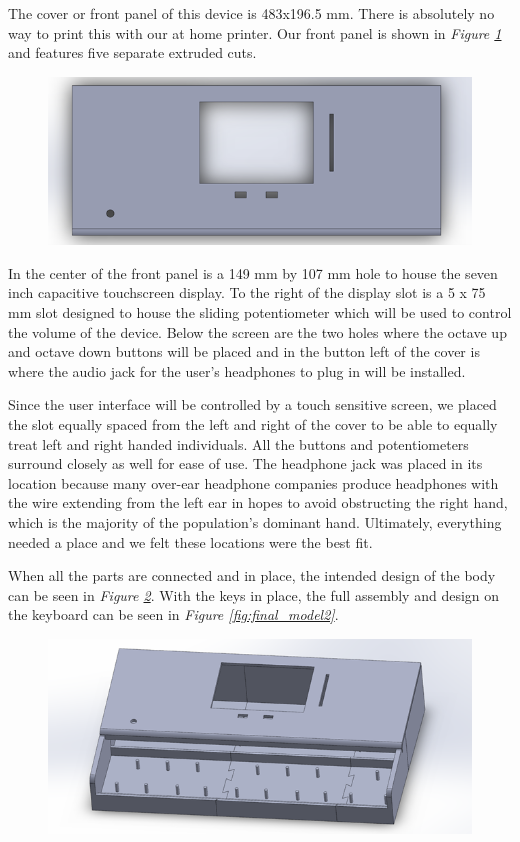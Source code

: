 The cover or front panel of this device is 483x196.5 mm. There is absolutely no way to print this with our at home printer. Our front panel is shown in \textit{Figure \ref{fig:display_model}} and features five separate extruded cuts.

\begin{figure}[h!]
  \centering
  \includegraphics[width=0.9\linewidth]{image/DisplayModel.png}
  \caption{}
  \label{fig:display_model}
\end{figure}

In the center of the front panel is a 149 mm by 107 mm hole to house the seven inch capacitive touchscreen display. To the right of the display slot is a 5 x 75 mm slot designed to house the sliding potentiometer which will be used to control the volume of the device. Below the screen are the two holes where the octave up and octave down buttons will be placed and in the button left of the cover is where the audio jack for the user’s headphones to plug in will be installed.

Since the user interface will be controlled by a touch sensitive screen, we placed the slot equally spaced from the left and right of the cover to be able to equally treat left and right handed individuals. All the buttons and potentiometers surround closely as well for ease of use. The headphone jack was placed in its location because many over-ear headphone companies produce headphones with the wire extending from the left ear in hopes to avoid obstructing the right hand, which is the majority of the population’s dominant hand. Ultimately, everything needed a place and we felt these locations were the best fit.

When all the parts are connected and in place, the intended design of the body can be seen in \textit{Figure \ref{fig:final_model1}}. With the keys in place, the full assembly and design on the keyboard can be seen in \textit{Figure \ref{fig:final_model2}}.

\begin{figure}[h!]
  \centering
  \includegraphics[width=0.8\linewidth]{image/FinalModel1.png}
  \caption{}
  \label{fig:final_model1}
\end{figure}

